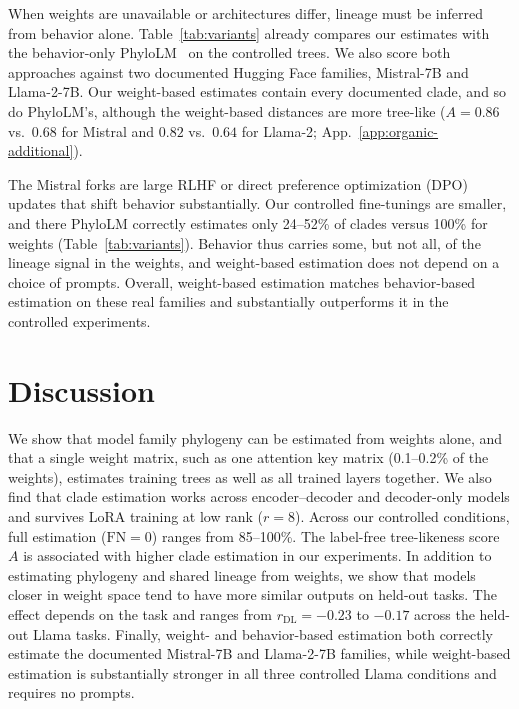 \documentclass{article}
\theoremstyle{definition}
\theoremstyle{plain}
\begin{document}
When weights are unavailable or architectures differ, lineage must be inferred from behavior alone. Table~\ref{tab:variants} already compares our estimates with the behavior-only PhyloLM~\citep{yax2025phylolm} on the controlled trees. We also score both approaches against two documented Hugging Face families, Mistral-7B and Llama-2-7B. Our weight-based estimates contain every documented clade, and so do PhyloLM's, although the weight-based distances are more tree-like ($A=0.86$ vs.\ $0.68$ for Mistral and $0.82$ vs.\ $0.64$ for Llama-2; App.~\ref{app:organic-additional}).

The Mistral forks are large RLHF or direct preference optimization (DPO) updates that shift behavior substantially. Our controlled fine-tunings are smaller, and there PhyloLM correctly estimates only 24--52\% of clades versus 100\% for weights (Table~\ref{tab:variants}). Behavior thus carries some, but not all, of the lineage signal in the weights, and weight-based estimation does not depend on a choice of prompts. Overall, weight-based estimation matches behavior-based estimation on these real families and substantially outperforms it in the controlled experiments.

\section{Discussion}
\label{sec:discussion}

We show that model family phylogeny can be estimated from weights alone, and that a single weight matrix, such as one attention key matrix (0.1--0.2\% of the weights), estimates training trees as well as all trained layers together. We also find that clade estimation works across encoder--decoder and decoder-only models and survives LoRA training at low rank ($r=8$). Across our controlled conditions, full estimation ($\mathrm{FN}=0$) ranges from 85--100\%. The label-free tree-likeness score $A$ is associated with higher clade estimation in our experiments. In addition to estimating phylogeny and shared lineage from weights, we show that models closer in weight space tend to have more similar outputs on held-out tasks. The effect depends on the task and ranges from $r_{\mathrm{DL}}=-0.23$ to $-0.17$ across the held-out Llama tasks. Finally, weight- and behavior-based estimation both correctly estimate the documented Mistral-7B and Llama-2-7B families, while weight-based estimation is substantially stronger in all three controlled Llama conditions and requires no prompts.
\end{document}
